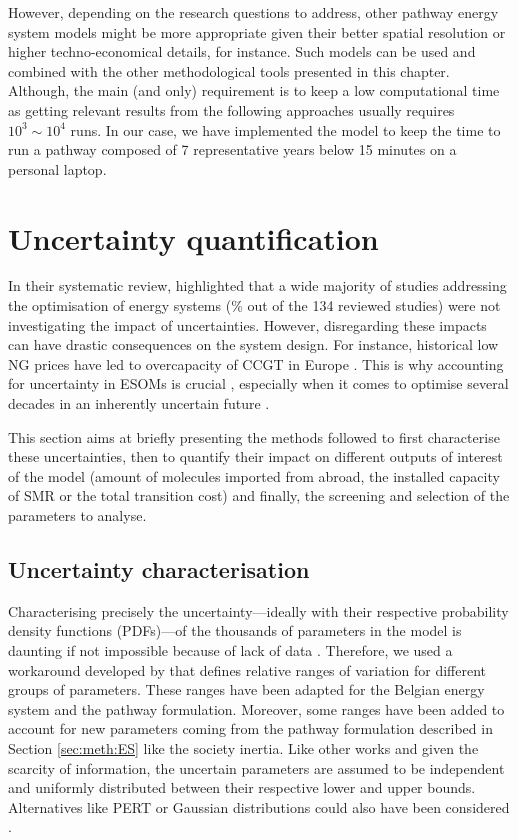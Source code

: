 However, depending on the research questions to address, other pathway energy system models might be more appropriate given their better spatial resolution or higher techno-economical details, for instance. Such models can be used and combined with the other methodological tools presented in this chapter. Although, the main (and only) requirement is to keep a low computational time as getting relevant results from the following approaches usually requires $10^3\sim 10^4$ runs.  In our case, we have implemented the model to keep the time to run a pathway composed of 7 representative years below 15 minutes on a personal laptop.


\section{Uncertainty quantification}
\label{sec:meth:UQ}
In their systematic review, \citet{yue2018review} highlighted that a wide majority of studies addressing the optimisation of energy systems (\% out of the 134 reviewed studies) were not investigating the impact of uncertainties. However, disregarding these impacts can have drastic consequences on the system design. For instance, historical low \gls{NG} prices have led to overcapacity of \gls{CCGT} in Europe \cite{moret2020overcapacity}. This is why accounting for uncertainty in \gls{ESOMs} is crucial \cite{mavromatidis2018uncertainty}, especially when it comes to optimise several decades in an inherently uncertain future \cite{peace2008insights}.

This section aims at briefly presenting the methods followed to first characterise these uncertainties, then to quantify their impact on different outputs of interest of the model (\eg amount of molecules imported from abroad, the installed capacity of \gls{SMR} or the total transition cost) and finally, the screening and selection of the parameters to analyse.

\subsection{Uncertainty characterisation}
\label{subsec:uncert_charac}
Characterising precisely the uncertainty---ideally with their respective probability density functions (PDFs)---of the thousands of parameters in the model is daunting if not impossible because of lack of data \cite{marnay2006addressing}. Therefore, we used a workaround developed by \citet{Moret2017} that defines relative ranges of variation for different groups of parameters. These ranges have been adapted for the Belgian energy system and the pathway formulation. Moreover, some ranges have been added to account for new parameters coming from the pathway formulation described in Section \ref{sec:meth:ES} like the society inertia. Like other works \cite{li2019renewables,coppitters2021robust,Moret2017PhDThesis} and given the scarcity of information, the uncertain parameters are assumed to be independent and uniformly distributed between their respective lower and upper bounds. Alternatives like PERT or Gaussian distributions could also have been considered \cite{coppittersthesis}.

